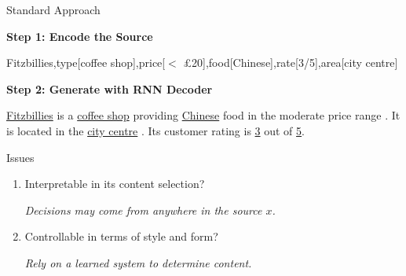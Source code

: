 
\begin{frame}{Standard Approach}


\textbf{Step 1: Encode the Source}
\air

\begin{small}
Fitzbillies,type[coffee shop],price[$<$ \pounds 20],food[Chinese],rate[3/5],area[city centre]
\end{small}

\vspace{0.3cm}

\textbf{Step 2: Generate with RNN Decoder}

\air

\underline{Fitzbillies}  is a  \underline{coffee shop}  providing  \underline{Chinese} food in the  moderate  price range  .  It is  located in the  \underline{city centre}  .  Its customer rating is  \underline{3} out of \underline{5}.

\end{frame}

\begin{frame}{Issues}
\begin{enumerate}
\item Interpretable in its content selection?
  \air

  \textit{Decisions may come from anywhere in the source $x$.}

  \air

\item Controllable in terms of style and form?
  \air

  \textit{Rely on a learned system to determine content.}
\end{enumerate}
  
\end{frame}


